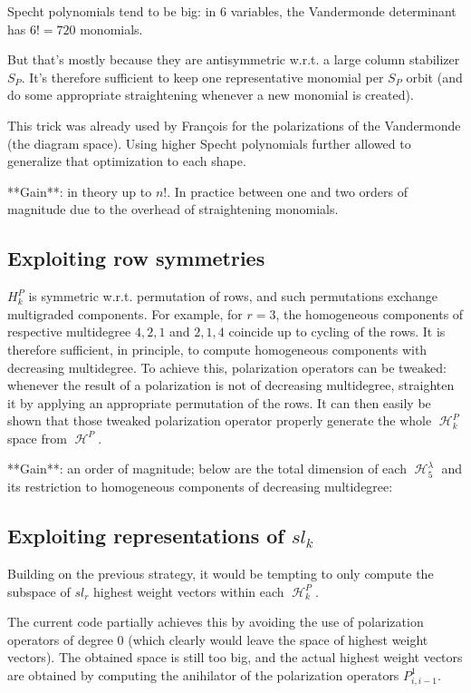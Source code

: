 \documentclass[letter,12pt]{article}
\DeclareMathOperator{\harmonics}{\mathcal{H}}
\begin{document}
	Specht polynomials tend to be big: in $6$ variables, the Vandermonde determinant has $6!=720$ monomials.
	
	But that's mostly because they are antisymmetric w.r.t. a large column stabilizer $S_P$. It's therefore sufficient to keep one representative monomial per $S_P$ orbit (and do some appropriate straightening whenever a new monomial is created). 
	
	This trick was already used by François for the polarizations of the Vandermonde (the diagram space). Using higher Specht polynomials further allowed  to generalize that optimization to each shape.
	
	**Gain**: in theory up to $n!$. In practice between one and two orders of magnitude due to the overhead of straightening monomials.
	
	\subsection{Exploiting row symmetries}
	
	$H_k^P$ is symmetric w.r.t. permutation of rows, and such permutations
	exchange multigraded components. For example, for $r=3$, the homogeneous components of respective multidegree $4,2,1$ and $2,1,4$ coincide
	up to cycling of the rows. It is therefore sufficient, in principle, to compute homogeneous components with decreasing multidegree.
	To achieve this, polarization operators can be tweaked: whenever the result of a polarization is not of decreasing multidegree, straighten it by applying an appropriate permutation of the rows. It can then easily be shown that those tweaked polarization operator properly generate the whole $\harmonics_k^P$ space from $\harmonics^P$.
	
	**Gain**: an order of magnitude; below are the total dimension of each $\harmonics_5^\lambda$ and its restriction to homogeneous components of decreasing multidegree:
	
	\subsection{Exploiting representations of $sl_k$}
	
	Building on the previous strategy, it would be tempting to only compute the subspace of $sl_r$ highest weight vectors within each $\harmonics_k^P$.
	
	The current code partially achieves this by avoiding the use of polarization operators of degree $0$ (which clearly would leave the space of highest weight vectors). The obtained space is still too big, and the actual highest weight vectors are obtained by computing the anihilator of the polarization operators $P_{i,i-1}^1$.
	
\end{document}
